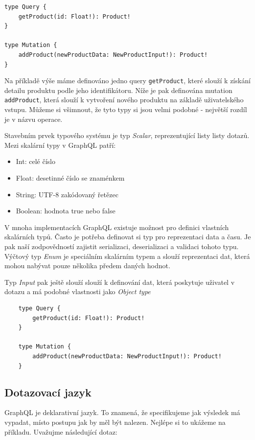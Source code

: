 \documentclass[thesis=M,czech]{FITthesis}[2019/12/23]
\begin{document}
\begin{verbatim}
type Query {    
    getProduct(id: Float!): Product!
}

type Mutation {
    addProduct(newProductData: NewProductInput!): Product!
}
\end{verbatim}

Na příkladě výše máme definováno jedno query \texttt{getProduct}, které slouží k získání detailu produktu podle jeho identifikátoru. Níže je pak definována mutation \texttt{addProduct}, která slouží k vytvoření nového produktu na základě uživatelského vstupu. Můžeme si všimnout, že tyto typy si jsou velmi podobné - největší rozdíl je v názvu operace.

Stavebním prvek typového systému je typ \textit{Scalar}, reprezentující listy listy dotazů. Mezi skalární typy v GraphQL patří:
\begin{itemize}
    \item Int: celé číslo
    \item Float: desetinné číslo se znaménkem
    \item String: UTF-8 zakódovaný řetězec
    \item Boolean: hodnota true nebo false
\end{itemize}
V mnoha implementacích GraphQL existuje možnost pro definici vlastních skalárních typů. Často je potřeba definovat si typ pro reprezentaci data a času. Je pak naší zodpovědností zajistit serializaci, deserializaci a validaci tohoto typu. Výčtový typ \textit{Enum} je speciálním skalárním typem a slouží reprezentaci dat, která mohou nabývat pouze několika předem daných hodnot. 

Typ \textit{Input} pak ještě slouží slouží k definování dat, která poskytuje uživatel v dotazu a má podobné vlastnosti jako \textit{Object type}
\begin{verbatim}
    type Query {    
        getProduct(id: Float!): Product!
    }
    
    type Mutation {
        addProduct(newProductData: NewProductInput!): Product!
    }
\end{verbatim}

\subsection{Dotazovací jazyk}
GraphQL je deklarativní jazyk. To znamená, že specifikujeme jak výsledek má vypadat, místo postupu jak by měl být nalezen. Nejlépe si to ukážeme na příkladu. Uvažujme následující dotaz:
\end{document}
